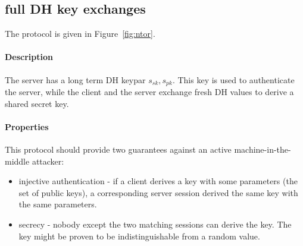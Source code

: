\documentclass{article}
\newcommand{\sfsk}{\mathit{sk}}
\newcommand{\sfpk}{\mathit{pk}}
\begin{document}
\subsection{full DH key exchanges}

The protocol is given in Figure~\ref{fig:ntor}.

 \paragraph{Description}The server has a long term DH keypar $s_\sfsk,s_\sfpk$.
This key is used to authenticate the server, while the client and the server exchange fresh DH values to derive a shared secret key. 

\paragraph{Properties} This protocol should provide two guarantees against an active machine-in-the-middle attacker:
\begin{itemize}
\item injective authentication - if a client derives a key with some parameters (the set of public keys), a corresponding server session derived the same key with the same parameters.
\item secrecy - nobody except the two matching sessions can derive the key.  The key might be proven to be indistinguishable from a random value.
\end{itemize}
\end{document}
